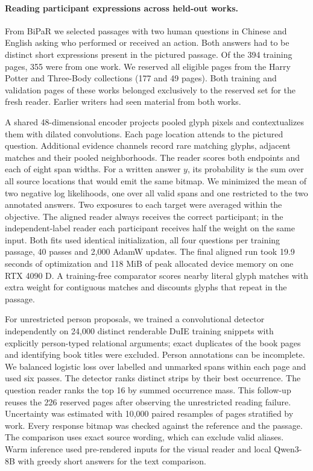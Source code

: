 \paragraph{Reading participant expressions across held-out works.}
From BiPaR we selected passages with two human questions in Chinese and English asking who performed or received an action. Both answers had to be distinct short expressions present in the pictured passage. Of the 394 training pages, 355 were from one work. We reserved all eligible pages from the Harry Potter and Three-Body collections (177 and 49 pages). Both training and validation pages of these works belonged exclusively to the reserved set for the fresh reader. Earlier writers had seen material from both works.

A shared 48-dimensional encoder projects pooled glyph pixels and contextualizes them with dilated convolutions. Each page location attends to the pictured question. Additional evidence channels record rare matching glyphs, adjacent matches and their pooled neighborhoods. The reader scores both endpoints and each of eight span widths. For a written answer $y$, its probability is the sum over all source locations that would emit the same bitmap. We minimized the mean of two negative log likelihoods, one over all valid spans and one restricted to the two annotated answers. Two exposures to each target were averaged within the objective. The aligned reader always receives the correct participant; in the independent-label reader each participant receives half the weight on the same input. Both fits used identical initialization, all four questions per training passage, 40 passes and 2,000 AdamW updates. The final aligned run took 19.9 seconds of optimization and 118 MiB of peak allocated device memory on one RTX 4090 D. A training-free comparator scores nearby literal glyph matches with extra weight for contiguous matches and discounts glyphs that repeat in the passage.

For unrestricted person proposals, we trained a convolutional detector independently on 24,000 distinct renderable DuIE training snippets with explicitly person-typed relational arguments; exact duplicates of the book pages and identifying book titles were excluded. Person annotations can be incomplete. We balanced logistic loss over labelled and unmarked spans within each page and used six passes. The detector ranks distinct strips by their best occurrence. The question reader ranks the top 16 by summed occurrence mass. This follow-up reuses the 226 reserved pages after observing the unrestricted reading failure. Uncertainty was estimated with 10,000 paired resamples of pages stratified by work. Every response bitmap was checked against the reference and the passage. The comparison uses exact source wording, which can exclude valid aliases. Warm inference used pre-rendered inputs for the visual reader and local Qwen3-8B with greedy short answers for the text comparison.
